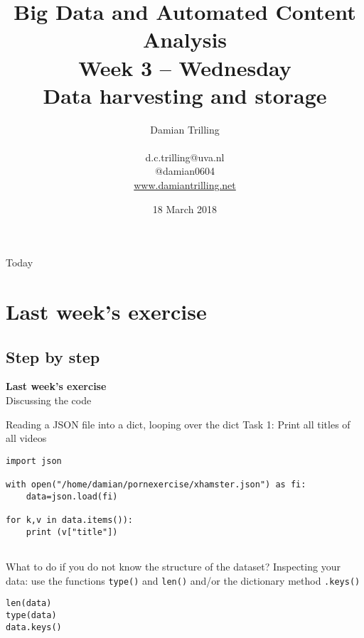 \documentclass{beamer}
\title[Big Data and Automated Content Analysis]{\textbf{Big Data and Automated Content Analysis} \\ Week 3 -- Wednesday \\ Data harvesting and storage}
\author[Damian Trilling]{Damian Trilling \\ ~ \\ \footnotesize{d.c.trilling@uva.nl \\@damian0604} \\ \url{www.damiantrilling.net}}
\date{18 March 2018}
\institute[UvA]{Afdeling Communicatiewetenschap \\Universiteit van Amsterdam}
\begin{document}
\begin{frame}{}
\titlepage
\end{frame}

\begin{frame}{Today}
\tableofcontents
\end{frame}



\section{Last week's exercise}
\subsection{Step by step}
\begin{frame}[plain]
\textbf{Last week's exercise}\\
\vspace{1cm}
Discussing the code
\end{frame}



\begin{frame}[fragile]{Reading a JSON file into a dict, looping over the dict}
Task 1: Print all titles of all videos
\begin{lstlisting}
import json

with open("/home/damian/pornexercise/xhamster.json") as fi:
    data=json.load(fi)

for k,v in data.items()):
    print (v["title"])
            
\end{lstlisting}
\end{frame}


\begin{frame}[fragile]{What to do if you do not know the structure of the dataset?}
	Inspecting your data: use the functions \texttt{type()} and \texttt{len()} and/or the dictionary method \texttt{.keys()}
\begin{lstlisting}
len(data)
type(data)
data.keys()
\end{lstlisting}
\end{frame}
\end{document}
